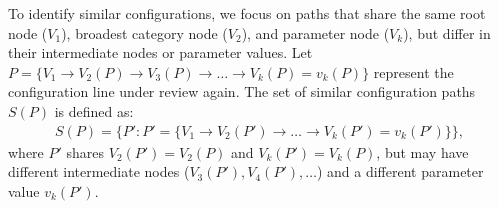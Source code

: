 
 To identify similar configurations, we focus on paths that share the same root node (\(V_1\)), broadest category node (\(V_2\)), and parameter node (\(V_k\)), but differ in their intermediate nodes or parameter values.  Let \( P = \{ V_1 \rightarrow V_2(P) \rightarrow V_3(P) \rightarrow \dots \rightarrow V_k(P) = v_k(P) \} \) represent the configuration line under review again.
The set of similar configuration paths \( S(P) \) is defined as:
\begin{multline*}
S(P) = \{ P' : P' = \{ V_1 \rightarrow V_2(P') \rightarrow \dots \rightarrow V_k(P') = v_k(P') \} \},
\end{multline*}
where \( P' \) shares \(V_2(P') = V_2(P)\) and \(V_k(P') = V_k(P)\), but may have different intermediate nodes (\( V_3(P'), V_4(P'), \dots \)) and a different parameter value \( v_k(P') \).

